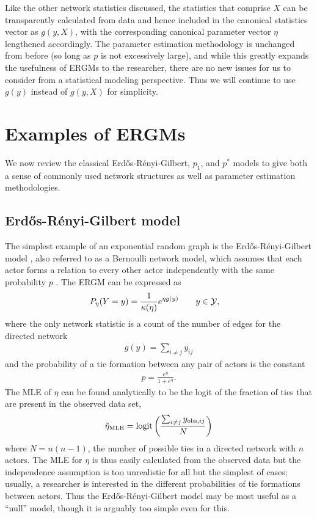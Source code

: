 Like the other network statistics discussed, the statistics that comprise $X$ can 
be transparently calculated from data and hence included in the canonical 
statistics vector as $g(y, X)$,
with the corresponding canonical parameter vector $\eta$ lengthened accordingly.
The parameter estimation methodology is unchanged from before (so long as $p$ is not
excessively large), and while this greatly expands the
usefulness of ERGMs to the researcher, there are no new issues for us to consider
from a statistical modeling perspective.
Thus we will continue to use $g(y)$ instead of $g(y,X)$ for simplicity.



\section{Examples of ERGMs} \label{S:ERGM examples}
We now review the classical Erd\H{o}s-R\'{e}nyi-Gilbert, $p_1$, and $p^*$ models to give both a sense of commonly used network structures as well as parameter estimation methodologies.

\subsection{Erd\H{o}s-R\'{e}nyi-Gilbert model} \label{S:Erdos}
The simplest example of an exponential random graph is the Erd\H{o}s-R\'{e}nyi-Gilbert 
model \citep{Erdos,Gilbert}, also referred to as a Bernoulli network model, which 
assumes that each actor forms a relation to every other actor independently with the 
same probability $p$ \citep{ergm}.  The ERGM can be expressed as
\begin{align*}
	P_{\eta}(Y=y) &= \frac{1}{\kappa( \eta) }e^{\eta g(y)}  \qquad y \in {\mathcal Y}, 
\end{align*}
where the only network statistic is a count of the number of edges for the directed network
\begin{align*}
	g(y) = \sum_{i \neq j} y_{ij}
\end{align*}
and the probability of a tie formation between any pair of actors is the constant
\begin{align*}
	p = \frac{e^{\eta}}{1+e^{\eta}}.
\end{align*}
The MLE of $\eta$ can be found analytically to be the logit of the 
fraction of ties that are present in the observed data set, 
\begin{align*}
	\hat{\eta}_{\textrm{MLE}} = \operatorname{logit} \left ( \frac{\sum_{i \neq j} y_{\textrm{obs}, ij}}{ N } \right )
\end{align*}
where $N = n(n-1)$, the number of possible ties in a directed network with $n$ actors.  
The MLE 
for $\eta$ is thus easily calculated from the observed data but the independence 
assumption is too unrealistic for all but the simplest of cases; usually, 
a researcher is interested in the different probabilities of tie formations 
between actors.  Thus the Erd\H{o}s-R\'{e}nyi-Gilbert model may be most 
useful as a ``null'' model, though it is arguably too simple even for this.

